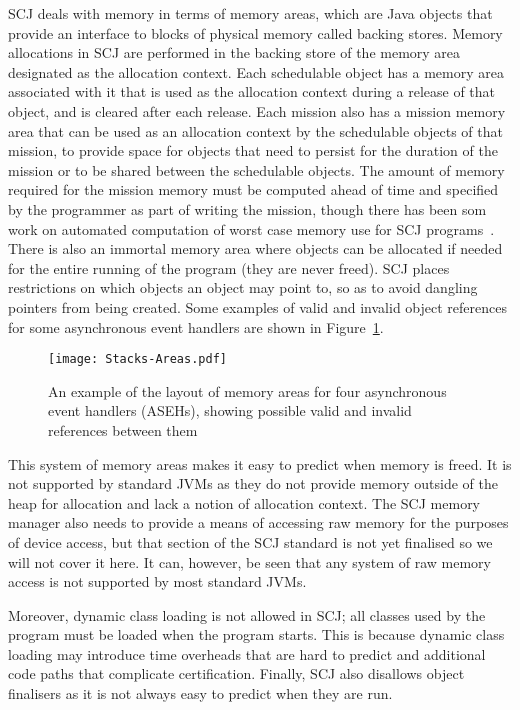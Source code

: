 \documentclass[a4paper,10pt]{report}
\begin{document}
SCJ deals with memory in terms of memory areas, which are Java objects
that provide an interface to blocks of physical memory called backing
stores.
Memory allocations in SCJ are performed in the backing store of the
memory area designated as the allocation context.
Each schedulable object has a memory area associated with it that is
used as the allocation context during a release of that object, and is
cleared after each release.
Each mission also has a mission memory area that can be used as an
allocation context by the schedulable objects of that mission, to
provide space for objects that need to persist for the duration of the
mission or to be shared between the schedulable objects.
The amount of memory required for the mission memory must be computed
ahead of time and specified by the programmer as part of writing the
mission, though there has been som work on automated computation of
worst case memory use for SCJ programs~\cite{andersen2013}.
There is also an immortal memory area where objects can be allocated
if needed for the entire running of the program (they are never
freed).
SCJ places restrictions on which objects an object may point to, so as
to avoid dangling pointers from being created.
Some examples of valid and invalid object references for some
asynchronous event handlers are shown in
Figure~\ref{stacks-areas-diagram}.

\begin{figure}[ht]
  \texttt{[image: Stacks-Areas.pdf]}
  \caption{An example of the layout of memory areas for four
    asynchronous event handlers (ASEHs), showing possible valid and
    invalid references between them}
  \label{stacks-areas-diagram}
\end{figure}

This system of memory areas makes it easy to predict when memory is
freed.
It is not supported by standard JVMs as they do not provide memory
outside of the heap for allocation and lack a notion of allocation
context.
The SCJ memory manager also needs to provide a means of accessing raw
memory for the purposes of device access, but that section of the SCJ
standard is not yet finalised so we will not cover it here.
It can, however, be seen that any system of raw memory access is not
supported by most standard JVMs.

Moreover, dynamic class loading is not allowed in SCJ; all classes
used by the program must be loaded when the program starts.
This is because dynamic class loading may introduce time overheads
that are hard to predict and additional code paths that complicate
certification.
Finally, SCJ also disallows object finalisers as it is not always easy
to predict when they are run.
\end{document}

